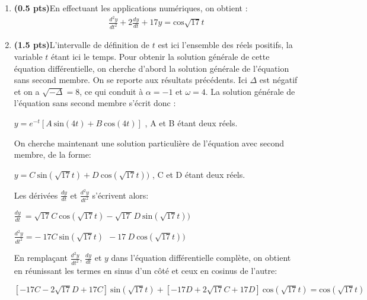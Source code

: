 \documentclass[fleqn]{article}
\begin{document}
\begin{enumerate}
\item \textbf{(0.5 pts)}En effectuant les applications num\'eriques, on obtient :
\begin{align*}
\frac{d^{2}y}{dt^{2}}+2 \frac{dy}{dt} +17y = \text{cos} \sqrt{17}t
\end{align*}
\item \textbf{(1.5 pts)}L'intervalle de d\'efinition de $t$ est ici l'ensemble des r\'eels positifs, la variable $t$ \'etant ici le temps.  Pour obtenir la solution g\'en\'erale de cette \'equation diff\'erentielle, on cherche d'abord la solution g\'en\'erale de l'\'equation sans second membre. On se reporte aux r\'esultats pr\'ec\'edents. Ici $\Delta$ est n\'egatif et on a $\sqrt{-\Delta} = 8$, ce qui conduit \`a $\alpha =-1$ et $\omega=4$. La solution g\'en\'erale de l'\'equation sans second membre s'\'ecrit donc :
\begin{center}

{$y= e^{- t}[A\  \text{sin}(4 t) + B\  \text{cos} (4 t)]$ , A et B \'etant deux r\'eels.}
\end{center}

{On cherche maintenant une solution particuli\`ere de l'\'equation avec second membre, de la forme:}
\begin{center}

{$y= C\ \text{sin}(\sqrt{17} t) + D\  \text{cos} (\sqrt{17} t))$ , C et D \'etant deux r\'eels.}
\end{center}

{Les d\'eriv\'ees $\frac{dy}{dt}$ et $\frac{d^{2}y}{dt^{2}}$ s'\'ecrivent alors:}
\begin{center}

{ $ \frac{dy}{dt}\ = \sqrt{17} C\ \text{cos}(\sqrt{17} t) - \sqrt{17\ } D\ \text{sin} (\sqrt{17} t))$}

{$\frac{d^{2}y}{dt^{2}}= - \ 17 C\ \text{sin}(\sqrt{17} t) \ \  -17\ D\ \text{cos} (\sqrt{17} t))$}
\end{center}

{En rempla\c cant $\frac{d^{2}y}{dt^{2}}$, $\frac{dy}{dt}$ et $y$ dans l'\'equation diff\'erentielle compl\`ete, on obtient en r\'eunissant les termes en sinus d'un c\^ot\'e et ceux en cosinus de l'autre:}

\begin{center}
{$[- 17C -2 \sqrt{17} D+17C]\ \text{sin}(\sqrt{17} t) + [-17 D+2\sqrt{17} C +17D]\ \text{cos}(\sqrt{17} t) = \text{cos}( \sqrt{17} t)$}
\end{center}


\end{enumerate}
\end{document}
